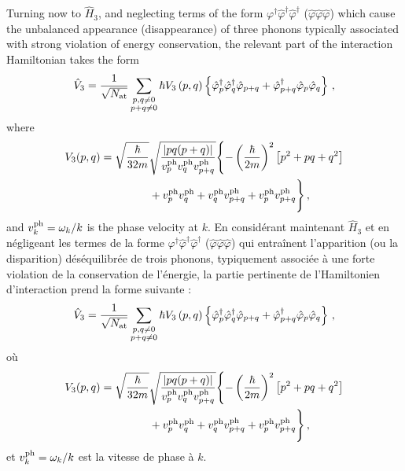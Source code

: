 \documentclass[aps,prd,notitlepage,amsfonts,amssymb,amsmath,nofootinbib,superscriptaddress,longbibliography]{revtex4-2}
\newcommand{\trad}[1]{\textcolor{tradcolor}{#1}}
\begin{document}
Turning now to $\hat{H}_{3}$, and neglecting terms of the form $\varphi^{\dagger}\hat{\varphi}^{\dagger}\hat{\varphi}^{\dagger}$ ($\hat{\varphi}\hat{\varphi}\hat{\varphi}$) which cause the unbalanced appearance (disappearance) of three phonons typically associated with strong violation of energy conservation, the relevant part of the interaction Hamiltonian takes the form
\begin{equation}
    \hat{V}_{3} = \frac{1}{\sqrt{N_{\rm at}}} \sum_{\substack{p,q \neq 0 \\ p+q \neq 0}} \hbar V_3\left(p,q\right) \left\{ \hat{\varphi}^{\dagger}_{p} \hat{\varphi}^{\dagger}_{q} \hat{\varphi}_{p+q} + \hat{\varphi}_{p+q}^{\dagger} \hat{\varphi}_{p}\hat{\varphi}_{q} \right\} \, ,
\label{eq:Hamiltonian_fluctuations}
\end{equation}
where
\begin{align}
\begin{split}
\label{def:V3_on_shell}
V_3 (p,q) = \sqrt{ \frac{\hbar}{32 m  } }  & \sqrt{\frac{ \left| p q (p+q) \right| }{v^{\rm ph}_p v^{\rm ph}_q v^{\rm ph}_{p+q}}} 
\Biggl\{ -\left(\frac{\hbar}{2m}\right)^{2} \left[ p^{2} + p q  + q^{2} \right] \\
& + v^{\rm ph}_p v^{\rm ph}_q + v^{\rm ph}_q v^{\rm ph}_{p+q} + v^{\rm ph}_p v^{\rm ph}_{p+q}  \Biggr\} \, ,
\end{split}
\end{align}
and $v^{\rm ph}_k = \omega_{k}/k$ is the phase velocity at $k$.
\trad{En considérant maintenant $\hat{H}_{3}$ et en négligeant les termes de la forme $\varphi^{\dagger}\hat{\varphi}^{\dagger}\hat{\varphi}^{\dagger}$ ($\hat{\varphi}\hat{\varphi}\hat{\varphi}$) qui entraînent l'apparition (ou la disparition) déséquilibrée de trois phonons, typiquement associée à une forte violation de la conservation de l'énergie, la partie pertinente de l'Hamiltonien d'interaction prend la forme suivante :
\begin{equation*}
    \hat{V}_{3} = \frac{1}{\sqrt{N_{\rm at}}} \sum_{\substack{p,q \neq 0 \\ p+q \neq 0}} \hbar V_3\left(p,q\right) \left\{ \hat{\varphi}^{\dagger}_{p} \hat{\varphi}^{\dagger}_{q} \hat{\varphi}_{p+q} + \hat{\varphi}_{p+q}^{\dagger} \hat{\varphi}_{p}\hat{\varphi}_{q} \right\} \, ,
\end{equation*}
où
\begin{align}
\begin{split}
\label{def:V3_on_shell}
V_3 (p,q) = \sqrt{ \frac{\hbar}{32 m  } }  & \sqrt{\frac{ \left| p q (p+q) \right| }{v^{\rm ph}_p v^{\rm ph}_q v^{\rm ph}_{p+q}}} 
\Biggl\{ -\left(\frac{\hbar}{2m}\right)^{2} \left[ p^{2} + p q  + q^{2} \right] \\
& + v^{\rm ph}_p v^{\rm ph}_q + v^{\rm ph}_q v^{\rm ph}_{p+q} + v^{\rm ph}_p v^{\rm ph}_{p+q}  \Biggr\} \, ,
\end{split}
\end{align}
et $v^{\rm ph}_k = \omega_{k}/k$ est la vitesse de phase à $k$.}
\end{document}
